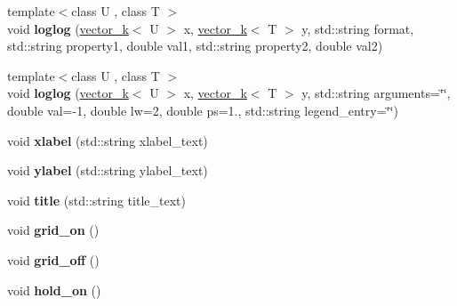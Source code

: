 \begin{DoxyCompactItemize}
\item 
\hypertarget{classkeycpp_1_1_figure_a754029d234c8f158bc76f922478b4989}{{\footnotesize template$<$class U , class T $>$ }\\void {\bfseries loglog} (\hyperlink{classkeycpp_1_1vector__k}{vector\-\_\-k}$<$ U $>$ x, \hyperlink{classkeycpp_1_1vector__k}{vector\-\_\-k}$<$ T $>$ y, std\-::string format, std\-::string property1, double val1, std\-::string property2, double val2)}\label{classkeycpp_1_1_figure_a754029d234c8f158bc76f922478b4989}

\item 
\hypertarget{classkeycpp_1_1_figure_a47bd6b639238654f2b1318fb0cfa601e}{{\footnotesize template$<$class U , class T $>$ }\\void {\bfseries loglog} (\hyperlink{classkeycpp_1_1vector__k}{vector\-\_\-k}$<$ U $>$ x, \hyperlink{classkeycpp_1_1vector__k}{vector\-\_\-k}$<$ T $>$ y, std\-::string arguments=\char`\"{}\char`\"{}, double val=-\/1, double lw=2, double ps=1., std\-::string legend\-\_\-entry=\char`\"{}\char`\"{})}\label{classkeycpp_1_1_figure_a47bd6b639238654f2b1318fb0cfa601e}

\item 
\hypertarget{classkeycpp_1_1_figure_addd610a718f021f3e6c7c94f9bc7f285}{void {\bfseries xlabel} (std\-::string xlabel\-\_\-text)}\label{classkeycpp_1_1_figure_addd610a718f021f3e6c7c94f9bc7f285}

\item 
\hypertarget{classkeycpp_1_1_figure_aa965967db2165b001860f75fc22c9f28}{void {\bfseries ylabel} (std\-::string ylabel\-\_\-text)}\label{classkeycpp_1_1_figure_aa965967db2165b001860f75fc22c9f28}

\item 
\hypertarget{classkeycpp_1_1_figure_a922bd966ed40095f0ae7fa184f9d0ada}{void {\bfseries title} (std\-::string title\-\_\-text)}\label{classkeycpp_1_1_figure_a922bd966ed40095f0ae7fa184f9d0ada}

\item 
\hypertarget{classkeycpp_1_1_figure_a3c036559f8ad56b099ac0b44c652225d}{void {\bfseries grid\-\_\-on} ()}\label{classkeycpp_1_1_figure_a3c036559f8ad56b099ac0b44c652225d}

\item 
\hypertarget{classkeycpp_1_1_figure_a3736e01bc278c2c2b47e4ff046fdda0e}{void {\bfseries grid\-\_\-off} ()}\label{classkeycpp_1_1_figure_a3736e01bc278c2c2b47e4ff046fdda0e}

\item 
\hypertarget{classkeycpp_1_1_figure_a65b80e5b67c7bbf225e3001a538a6dad}{void {\bfseries hold\-\_\-on} ()}\label{classkeycpp_1_1_figure_a65b80e5b67c7bbf225e3001a538a6dad}


\end{DoxyCompactItemize}
